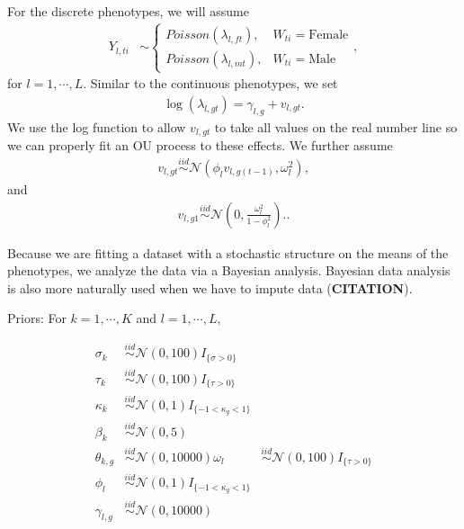 \documentclass[
  12pt,
]{article}
\begin{document}
For the discrete phenotypes, we will assume \begin{align}
{Y}_{l,ti} & \sim \left\{\begin{array}{ll} Poisson(\lambda_{l,ft}), & W_{ti} = \text{Female} \\ Poisson(\lambda_{l,mt}), & W_{ti} = \text{Male} \end{array}\right.,
\label{eq:Y}
\end{align} for \(l = 1,\cdots,L\). Similar to the continuous
phenotypes, we set \begin{align}
\log(\lambda_{l,gt}) = \gamma_{l,g} + v_{l,gt}.
\label{eq:lambda}
\end{align} We use the log function to allow \(v_{l,gt}\) to take all
values on the real number line so we can properly fit an OU process to
these effects. We further assume \begin{align}
v_{l,gt} \overset{iid}{\sim}\mathcal{N}(\phi_{l} v_{l,g(t-1)} , \omega_l^2),
\label{eq:v_ar1}
\end{align} and \begin{align}
v_{l,g1} \overset{iid}{\sim}\mathcal{N}\left(0,\frac{\omega_l^2}{1 - \phi_{l}^2}\right)..
\label{eq:v1}
\end{align}

Because we are fitting a dataset with a stochastic structure on the
means of the phenotypes, we analyze the data via a Bayesian analysis.
Bayesian data analysis is also more naturally used when we have to
impute data (\textbf{CITATION}).

Priors: For \(k = 1,\cdots,K\) and \(l = 1,\cdots,L\),

\begin{align}
\sigma_k & \overset{iid}{\sim}\mathcal{N}(0,100)I_{\{\sigma > 0\}} \nonumber \\
\tau_k & \overset{iid}{\sim}\mathcal{N}(0,100)I_{\{\tau > 0\}} \nonumber \\
\kappa_k & \overset{iid}{\sim}\mathcal{N}(0,1)I_{\{-1 < \kappa_g < 1\}} \nonumber \\
\beta_k & \overset{iid}{\sim}\mathcal{N}(0,5) \\
\theta_{k,g} & \overset{iid}{\sim}\mathcal{N}(0,10000)
\omega_l & \overset{iid}{\sim}\mathcal{N}(0,100)I_{\{\tau > 0\}} \nonumber \\
\phi_l & \overset{iid}{\sim}\mathcal{N}(0,1)I_{\{-1 < \kappa_g < 1\}} \nonumber \\
\gamma_{l,g} & \overset{iid}{\sim}\mathcal{N}(0,10000)
\label{eq:priors}
\end{align}
\end{document}
